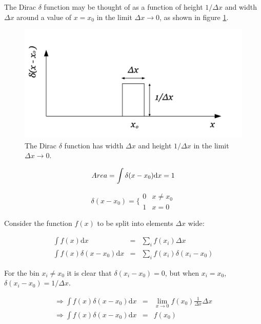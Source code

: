 The Dirac $\delta$ function may be thought of as a function of height $1/\Delta x$ and width $\Delta x$ around a value of $x = x_0$ in the limit $\Delta x \to 0$, as shown in figure \ref{fig:ch4_diracDelta}.

\begin{figure}[!htb]
  \begin{center}
    \includegraphics[width=\textwidth]{images/chapter_4/diracDelta.pdf}
    \caption[The Dirac $\delta$ function]{The Dirac $\delta$ function has width $\Delta x$ and height $1/\Delta x$ in the limit $\Delta x\to 0$.}
    \label{fig:ch4_diracDelta}
  \end{center}
\end{figure}

\[
  Area = \int \delta(x - x_0) \mathrm{d}x = 1 \\
\]

\[
  \delta(x-x_0) =
  \Bigg\{
    \begin{array}{cc}
    0 & x\neq x_0 \\
    1 & x = 0
    \end{array}{}
\]

Consider the function $f(x)$ to be split into elements $\Delta x$ wide:

\begin{eqnarray*}
  \int f(x) \mathrm{d}x & =  & \displaystyle\sum_i f(x_i) \Delta x \\
  \int f(x) \delta(x-x_0) \mathrm{d}x & = & \displaystyle\sum_i f(x_i)\delta(x_i - x_0)
\end{eqnarray*}

For the bin $x_i \neq x_0$ it is clear that $\delta(x_i - x_0) = 0$, but when $x_i = x_0$, $\delta(x_i - x_0) = 1/\Delta x$.

\begin{eqnarray*}
  \Rightarrow \int f(x)\delta(x-x_0)\mathrm{d}x & = & \lim_{x \to 0} f(x_0) \frac{1}{\Delta x}\Delta x \\
  \Rightarrow \int f(x)\delta(x-x_0)\mathrm{d}x & = & f(x_0)
\end{eqnarray*}

